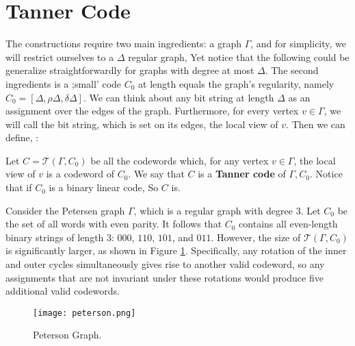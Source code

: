 \documentclass[12pt,a4paper]{article}
\begin{document}
\section{Tanner Code}
The constructions require two main ingredients: a graph $\Gamma$, and for simplicity, we will restrict ourselves to a $\Delta$ regular graph, Yet notice that the following could be generalize straightforwardly for graphs with degree at most $\Delta$. The second ingredients is a ;small' code $C_{0}$ at length equals the graph's regularity, namely $C_{0} = [\Delta,\rho\Delta, \delta\Delta]$. We can think about any bit string at length $\Delta$ as an assignment over the edges of the graph. Furthermore, for every vertex $v \in \Gamma$, we will call the bit string, which is set on its edges, the local view of $v$. Then we can define, \cite{Tanner}:
  \begin{definition}  Let $ C = \mathcal{T}\left( \Gamma, C_{0} \right)$  be all the codewords which, for any vertex $v\in \Gamma$, the local view of $v$ is a codeword of $C_{0}$. We say that $C$ is a \textbf{Tanner code}\label{Tan} of $\Gamma, C_{0}$. Notice that if $C_{0}$ is a binary linear code, So $C$ is.  
  \end{definition}
  \begin{example}
Consider the Petersen graph $\Gamma$, which is a regular graph with degree $3$. Let $C_{0}$ be the set of all words with even parity. It follows that $C_{0}$ contains all even-length binary strings of length $3$: $000$, $110$, $101$, and $011$. However, the size of $\mathcal{T}(\Gamma, C_{0})$ is significantly larger, as shown in Figure \cref{fig:pet}. Specifically, any rotation of the inner and outer cycles simultaneously gives rise to another valid codeword, so any assignments that are not invariant under these rotations would produce five additional valid codewords.

  \end{example}

  \begin{figure}[h]
    \centering
    \texttt{[image: peterson.png]}
    \caption{Peterson Graph.}
    \label{fig:pet}
  \end{figure}
\end{document}

